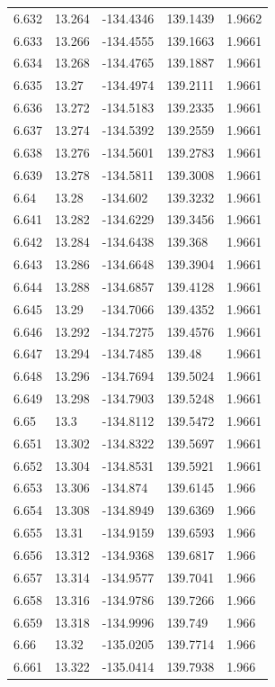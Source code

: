 \begin{tabular}{lllll}
6.632 & 13.264 & -134.4346 & 139.1439 & 1.9662 \\
6.633 & 13.266 & -134.4555 & 139.1663 & 1.9661 \\
6.634 & 13.268 & -134.4765 & 139.1887 & 1.9661 \\
6.635 & 13.27 & -134.4974 & 139.2111 & 1.9661 \\
6.636 & 13.272 & -134.5183 & 139.2335 & 1.9661 \\
6.637 & 13.274 & -134.5392 & 139.2559 & 1.9661 \\
6.638 & 13.276 & -134.5601 & 139.2783 & 1.9661 \\
6.639 & 13.278 & -134.5811 & 139.3008 & 1.9661 \\
6.64 & 13.28 & -134.602 & 139.3232 & 1.9661 \\
6.641 & 13.282 & -134.6229 & 139.3456 & 1.9661 \\
6.642 & 13.284 & -134.6438 & 139.368 & 1.9661 \\
6.643 & 13.286 & -134.6648 & 139.3904 & 1.9661 \\
6.644 & 13.288 & -134.6857 & 139.4128 & 1.9661 \\
6.645 & 13.29 & -134.7066 & 139.4352 & 1.9661 \\
6.646 & 13.292 & -134.7275 & 139.4576 & 1.9661 \\
6.647 & 13.294 & -134.7485 & 139.48 & 1.9661 \\
6.648 & 13.296 & -134.7694 & 139.5024 & 1.9661 \\
6.649 & 13.298 & -134.7903 & 139.5248 & 1.9661 \\
6.65 & 13.3 & -134.8112 & 139.5472 & 1.9661 \\
6.651 & 13.302 & -134.8322 & 139.5697 & 1.9661 \\
6.652 & 13.304 & -134.8531 & 139.5921 & 1.9661 \\
6.653 & 13.306 & -134.874 & 139.6145 & 1.966 \\
6.654 & 13.308 & -134.8949 & 139.6369 & 1.966 \\
6.655 & 13.31 & -134.9159 & 139.6593 & 1.966 \\
6.656 & 13.312 & -134.9368 & 139.6817 & 1.966 \\
6.657 & 13.314 & -134.9577 & 139.7041 & 1.966 \\
6.658 & 13.316 & -134.9786 & 139.7266 & 1.966 \\
6.659 & 13.318 & -134.9996 & 139.749 & 1.966 \\
6.66 & 13.32 & -135.0205 & 139.7714 & 1.966 \\
6.661 & 13.322 & -135.0414 & 139.7938 & 1.966 \\

\end{tabular}
